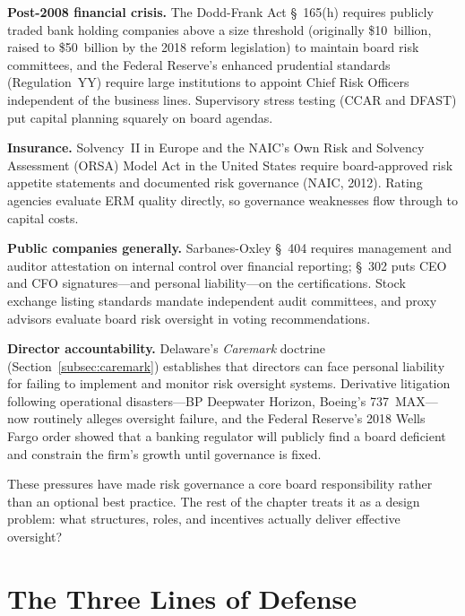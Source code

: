 \documentclass[11pt,openany]{book}
\begin{document}
\textbf{Post-2008 financial crisis.} The Dodd-Frank Act \S~165(h) requires
publicly traded bank holding companies above a size threshold (originally
\$10~billion, raised to \$50~billion by the 2018 reform legislation) to
maintain board risk committees, and the Federal Reserve's enhanced prudential
standards (Regulation~YY) require large institutions to appoint Chief Risk
Officers independent of the business lines. Supervisory stress testing (CCAR
and DFAST) put capital planning squarely on board agendas.

\textbf{Insurance.} Solvency~II in Europe and the NAIC's Own Risk and
Solvency Assessment (ORSA) Model Act in the United States require
board-approved risk appetite statements and documented risk governance
(NAIC, 2012). Rating agencies evaluate ERM quality directly, so governance
weaknesses flow through to capital costs.

\textbf{Public companies generally.} Sarbanes-Oxley \S~404 requires
management and auditor attestation on internal control over financial
reporting; \S~302 puts CEO and CFO signatures---and personal liability---on
the certifications. Stock exchange listing standards mandate independent
audit committees, and proxy advisors evaluate board risk oversight in voting
recommendations.

\textbf{Director accountability.} Delaware's \emph{Caremark} doctrine
(Section~\ref{subsec:caremark}) establishes that directors can face personal
liability for failing to implement and monitor risk oversight systems.
Derivative litigation following operational disasters---BP Deepwater Horizon,
Boeing's 737~MAX---now routinely alleges oversight failure, and the Federal
Reserve's 2018 Wells Fargo order showed that a banking regulator will
publicly find a board deficient and constrain the firm's growth until
governance is fixed.

These pressures have made risk governance a core board responsibility rather
than an optional best practice. The rest of the chapter treats it as a design
problem: what structures, roles, and incentives actually deliver effective
oversight?

\section{The Three Lines of Defense}
\label{sec:three-lines}
\end{document}
